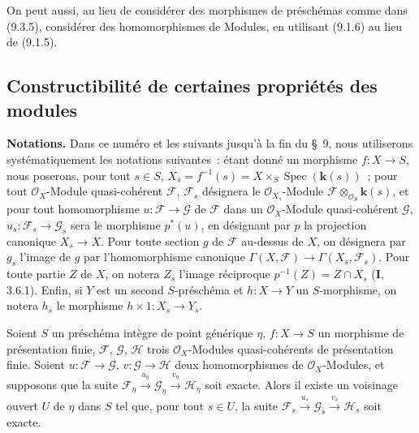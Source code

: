 On peut aussi, au lieu de considérer des morphismes de préschémas comme dans
(9.3.5), considérer des homomorphismes de Modules, en utilisant (9.1.6) au
lieu de (9.1.5).


\subsection{Constructibilité de certaines propriétés des modules}
\label{subsection:IV.9.4-fr}

\begin{env}[9.4.1]
\label{IV.9.4.1-fr}
\textbf{Notations.} Dans ce numéro et les suivants jusqu'à la fin du \S~9,
nous utiliserons systématiquement les notations suivantes~: étant donné un
morphisme $f:X\to S$, nous poserons, pour tout $s\in S$,
$X_s=f^{-1}(s)=X\times_S\operatorname{Spec}(\boldsymbol{k}(s))$~; pour tout
$\mathcal O_X$-Module quasi-cohérent $\mathcal F$, $\mathcal F_s$ désignera
le $\mathcal O_{X_s}$-Module
$\mathcal F\otimes_{\mathcal O_S}\boldsymbol{k}(s)$, et pour tout homomorphisme
$u:\mathcal F\to\mathcal G$ de $\mathcal F$ dans un $\mathcal O_X$-Module
quasi-cohérent $\mathcal G$, $u_s:\mathcal F_s\to\mathcal G_s$ sera le
morphisme $p^*(u)$, en désignant par $p$ la projection canonique $X_s\to X$.
Pour toute section $g$ de $\mathcal F$ au-dessus de $X$, on désignera par
$g_s$ l'image de $g$ par l'homomorphisme canonique
$\Gamma(X,\mathcal F)\to\Gamma(X_s,\mathcal F_s)$. Pour toute partie $Z$ de
$X$, on notera $Z_s$ l'image réciproque
$p^{-1}(Z)=Z\cap X_s$ (\textbf{I}, 3.6.1). Enfin, si $Y$ est un second
$S$-préschéma et $h:X\to Y$ un $S$-morphisme, on notera $h_s$ le morphisme
$h\times1:X_s\to Y_s$.
\end{env}

\begin{proposition}[9.4.2]
\label{IV.9.4.2-fr}
Soient $S$ un préschéma intègre de point générique $\eta$, $f:X\to S$ un
morphisme de présentation finie, $\mathcal F$, $\mathcal G$, $\mathcal H$
trois $\mathcal O_X$-Modules quasi-cohérents de présentation finie. Soient
$u:\mathcal F\to\mathcal G$, $v:\mathcal G\to\mathcal H$ deux
homomorphismes de $\mathcal O_X$-Modules, et supposons que la suite
$\mathcal F_\eta\xrightarrow{u_\eta}\mathcal G_\eta
\xrightarrow{v_\eta}\mathcal H_\eta$ soit exacte. Alors il existe un
voisinage ouvert $U$ de $\eta$ dans $S$ tel que, pour tout $s\in U$, la suite
$\mathcal F_s\xrightarrow{u_s}\mathcal G_s
\xrightarrow{v_s}\mathcal H_s$ soit exacte.
\end{proposition}

